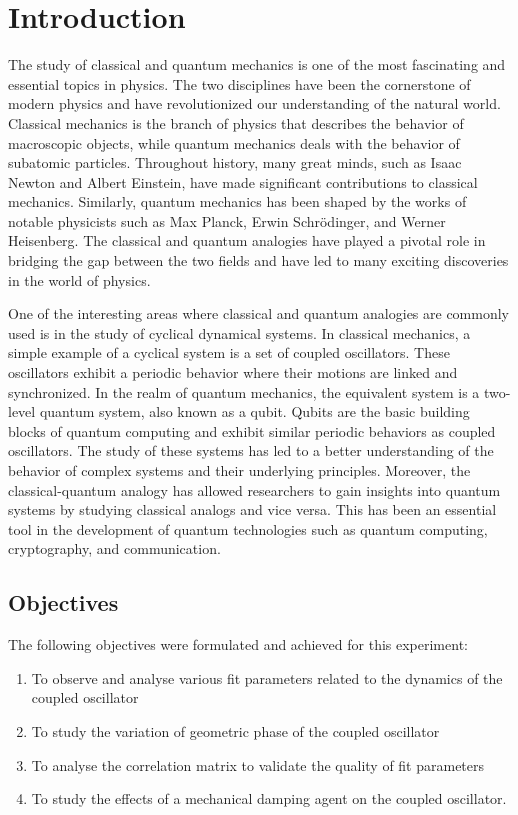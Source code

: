 \chapter{\label{intro}Introduction}

The study of classical and quantum mechanics is one of the most fascinating and essential topics in physics. The two disciplines have been the cornerstone of modern physics and have revolutionized our understanding of the natural world. Classical mechanics is the branch of physics that describes the behavior of macroscopic objects, while quantum mechanics deals with the behavior of subatomic particles. Throughout history, many great minds, such as Isaac Newton and Albert Einstein, have made significant contributions to classical mechanics. Similarly, quantum mechanics has been shaped by the works of notable physicists such as Max Planck, Erwin Schrödinger, and Werner Heisenberg. The classical and quantum analogies have played a pivotal role in bridging the gap between the two fields and have led to many exciting discoveries in the world of physics.

One of the interesting areas where classical and quantum analogies are commonly used is in the study of cyclical dynamical systems. In classical mechanics, a simple example of a cyclical system is a set of coupled oscillators. These oscillators exhibit a periodic behavior where their motions are linked and synchronized. In the realm of quantum mechanics, the equivalent system is a two-level quantum system, also known as a qubit. Qubits are the basic building blocks of quantum computing and exhibit similar periodic behaviors as coupled oscillators. The study of these systems has led to a better understanding of the behavior of complex systems and their underlying principles. Moreover, the classical-quantum analogy has allowed researchers to gain insights into quantum systems by studying classical analogs and vice versa. This has been an essential tool in the development of quantum technologies such as quantum computing, cryptography, and communication.

\section{Objectives}

The following objectives were formulated and achieved for this experiment:

\begin{enumerate}
	\item To observe and analyse various fit parameters related to the dynamics of the coupled oscillator
	\item To study the variation of geometric phase of the coupled oscillator
	\item To analyse the correlation matrix to validate the quality of fit parameters
	\item To study the effects of a mechanical damping agent on the coupled oscillator.
\end{enumerate}


\setcounter{equation}{0}
\setcounter{table}{0}
\setcounter{figure}{0}


    



